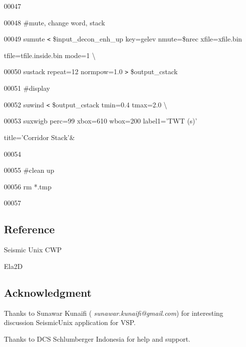 \documentclass{article}
\begin{document}
\vspace{4pt}
00047 

\vspace{4pt}
00048 \#mute, change word, stack

\vspace{4pt}
\parindent=0pt
00049 sumute \texttt{<} \$input\_decon\_enh\_up key=gelev nmute=\$nrec xfile=xfile.bin 

\vspace{4pt}
\parindent=18pt
tfile=tfile.inside.bin mode=1 \textbackslash{}

\vspace{4pt}
\parindent=0pt
00050            \textbar{} sustack repeat=12 normpow=1.0 \texttt{>} \$output\_cstack

\vspace{4pt}
00051 \#display   

\vspace{4pt}
00052 suwind \texttt{<}  \$output\_cstack tmin=0.4 tmax=2.0 \textbackslash{}

\vspace{4pt}
00053            \textbar{} suxwigb perc=99 xbox=610 wbox=200 label1='TWT (s)' 

\vspace{4pt}
\parindent=18pt
title='Corridor Stack'\&

\vspace{4pt}
\parindent=0pt
00054 

\vspace{4pt}
00055 \#clean up

\vspace{4pt}
00056 rm *.tmp

\vspace{4pt}
00057 \pagebreak{}

\vspace{12pt}
\subsection*{{\large{}\textbf{Reference}}}

\vspace{12pt}
Seismic Unix CWP 

\vspace{12pt}
Ela2D

\vspace{36pt}
\subsection*{{\large{}\textbf{Acknowledgment}}}

\vspace{12pt}
Thanks to Sunawar Kunaifi ({\color{color02} \emph{sunawar.kunaifi@gmail.com}}) 
for interesting discussion SeismicUnix application for VSP.

\vspace{24pt}
Thanks to DCS Schlumberger Indonesia for help and support.

\newpage
\end{document}
